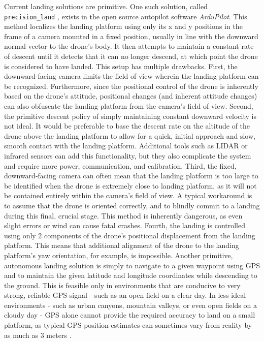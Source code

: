 Current landing solutions are primitive. One such solution, called \texttt{precision\_land} \cite{precision_land_website}, exists in the open source autopilot software \textit{ArduPilot}. This method localizes the landing platform using only its x and y positions in the frame of a camera mounted in a fixed position, usually in line with the downward normal vector to the drone's body. It then attempts to maintain a constant rate of descent until it detects that it can no longer descend, at which point the drone is considered to have landed. This setup has multiple drawbacks. First, the downward-facing camera limits the field of view wherein the landing platform can be recognized. Furthermore, since the positional control of the drone is inherently based on the drone's attitude, positional changes (and inherent attitude changes) can also obfuscate the landing platform from the camera's field of view. Second, the primitive descent policy of simply maintaining constant downward velocity is not ideal. It would be preferable to base the descent rate on the altitude of the drone above the landing platform to allow for a quick, initial approach and slow, smooth contact with the landing platform. Additional tools such as LIDAR or infrared sensors can add this functionality, but they also complicate the system and require more power, communication, and calibration. Third, the fixed, downward-facing camera can often mean that the landing platform is too large to be identified when the drone is extremely close to landing platform, as it will not be contained entirely within the camera's field of view. A typical workaround is to assume that the drone is oriented correctly, and to blindly commit to a landing during this final, crucial stage. This method is inherently dangerous, as even slight errors or wind can cause fatal crashes. Fourth, the landing is controlled using only 2 components of the drone's positional displacement from the landing platform. This means that additional alignment of the drone to the landing platform's yaw orientation, for example, is impossible. Another primitive, autonomous landing solution is simply to navigate to a given waypoint using \gls{GPS} and to maintain the given latitude and longitude coordinates while descending to the ground. This is feasible only in environments that are conducive to very strong, reliable \gls{GPS} signal - such as an open field on a clear day. In less ideal environments - such as urban canyons, mountain valleys, or even open fields on a cloudy day - \gls{GPS} alone cannot provide the required accuracy to land on a small platform, as typical \gls{GPS} position estimates can sometimes vary from reality by as much as 3 meters \cite{accurate_landing_UAV_ground_pattern}.
